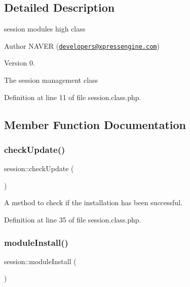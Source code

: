 \subsection{Detailed Description}
session module\textquotesingle{}s high class 

\begin{DoxyAuthor}{Author}
N\+A\+V\+ER (\href{mailto:developers@xpressengine.com}{\tt developers@xpressengine.\+com}) 
\end{DoxyAuthor}
\begin{DoxyVersion}{Version}
0.
\end{DoxyVersion}
The session management class 

Definition at line 11 of file session.\+class.\+php.



\subsection{Member Function Documentation}
\hypertarget{classsession_a30f6cc95b00bd35757aa882abce7ac34}{}\label{classsession_a30f6cc95b00bd35757aa882abce7ac34} 
\subsubsection{\texorpdfstring{check\+Update()}{checkUpdate()}}
{\footnotesize\ttfamily session\+::check\+Update (\begin{DoxyParamCaption}{ }\end{DoxyParamCaption})}



A method to check if the installation has been successful. 



Definition at line 35 of file session.\+class.\+php.

\hypertarget{classsession_af6b13ec50160d63aca04f689e5cac9dd}{}\label{classsession_af6b13ec50160d63aca04f689e5cac9dd} 
\subsubsection{\texorpdfstring{module\+Install()}{moduleInstall()}}
{\footnotesize\ttfamily session\+::module\+Install (\begin{DoxyParamCaption}{ }\end{DoxyParamCaption})}



